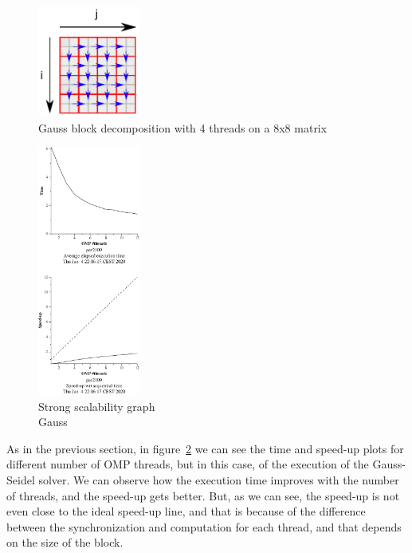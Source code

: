\begin{figure}[H]
    \centering
    \includegraphics[width=0.3\textwidth]{gauss_blocks}
    \caption{Gauss block decomposition with 4 threads on a 8x8 matrix}%
    \label{fig:blocks-gauss}
\end{figure}



\begin{figure}[H]
    \centering
    \includegraphics[width=0.3\textwidth]{heat-omp-strong-gauss-crop}
    \caption{Strong scalability graph \\ Gauss}%
    \label{fig:strong-gauss}
\end{figure}

As in the previous section, in figure~\ref{fig:strong-gauss} we can see the time and speed-up plots for different number 
of OMP threads, but in this case, of the execution of the Gauss-Seidel solver. We can observe how the execution time improves with the number of threads, and the speed-up gets better. But, as we can see, the speed-up is not even close to the ideal speed-up line, and that is because of the difference between the synchronization and computation for each thread, and that depends on the size of the block.

